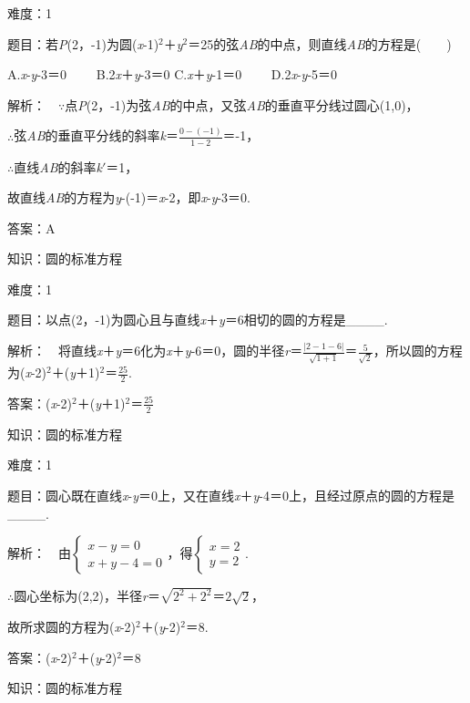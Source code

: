 \documentclass{article} %
\begin{document}
难度：1

题目：若\textit{P}(2，-1)为圆(\textit{x}-1)${}^{2}$＋\textit{y}${}^{2}$＝25的弦\textit{AB}的中点，则直线\textit{AB}的方程是(　　)

A.\textit{x}-\textit{y}-3＝0　　 B.2\textit{x}＋\textit{y}-3＝0 C.\textit{x}＋\textit{y}-1＝0　　 D.2\textit{x}-\textit{y}-5＝0

解析：　$\mathrm{\because}$点\textit{P}(2，-1)为弦\textit{AB}的中点，又弦\textit{AB}的垂直平分线过圆心(1,0)，

$\mathrm{\therefore}$弦\textit{AB}的垂直平分线的斜率\textit{k}＝$\frac{0-(-1)}{1-2}$＝-1，

$\mathrm{\therefore}$直线\textit{AB}的斜率\textit{k}$'$＝1，

故直线\textit{AB}的方程为\textit{y}-(-1)＝\textit{x}-2，即\textit{x}-\textit{y}-3＝0.

答案：A


知识：圆的标准方程

难度：1

题目：以点(2，-1)为圆心且与直线\textit{x}＋\textit{y}＝6相切的圆的方程是\_\_\_\_.

解析：　将直线\textit{x}＋\textit{y}＝6化为\textit{x}＋\textit{y}-6＝0，圆的半径\textit{r}＝$\frac{|2-1-6|}{\sqrt{1+1}}$＝$\frac{5}{\sqrt{2}}$，所以圆的方程为(\textit{x}-2)${}^{2}$＋(\textit{y}＋1)${}^{2}$＝$\frac{25}{2}$.

答案：(\textit{x}-2)${}^{2}$＋(\textit{y}＋1)${}^{2}$＝$\frac{25}{2}$

知识：圆的标准方程

难度：1

题目：圆心既在直线\textit{x}-\textit{y}＝0上，又在直线\textit{x}＋\textit{y}-4＝0上，且经过原点的圆的方程是\_\_\_\_.

解析：　由$\left\{\begin{array}{r} x-y=0\\ x+y-4=0 \end{array} \right.$，得$\left\{\begin{array}{r} x=2\\ y=2 \end{array} \right.$.

$\mathrm{\therefore}$圆心坐标为(2,2)，半径\textit{r}＝$\sqrt{2^2+2^2}$＝$2\sqrt{2}$，

故所求圆的方程为(\textit{x}-2)${}^{2}$＋(\textit{y}-2)${}^{2}$＝8.

答案：(\textit{x}-2)${}^{2}$＋(\textit{y}-2)${}^{2}$＝8


知识：圆的标准方程
\end{document}
